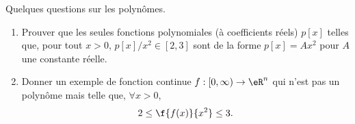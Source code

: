 
\begin{exercice}\label{exo0033}

Quelques questions sur les polynômes.
\begin{enumerate}
\item Prouver que les seules fonctions polynomiales (à coefficients réels) $p[x]$ telles que, pour tout $x>0$, $p[x]/ x^2\in[2,3]$ sont de la forme $p[x] = Ax^2$ pour $A$ une constante réelle.
\item Donner un exemple de fonction continue $f:[0,\infty)\rightarrow \eR^n$ qui n'est pas un polynôme mais telle que, $\forall x>0$,
\[
	2\leq\f{f(x)}{x^2}\leq3.
\] 
\end{enumerate}

\end{exercice}
